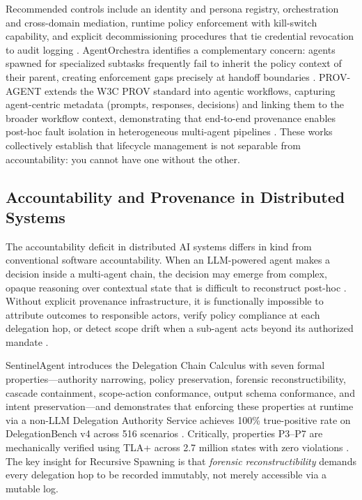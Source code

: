 Recommended controls include an identity and persona registry, orchestration and cross-domain mediation, runtime policy enforcement with kill-switch capability, and explicit decommissioning procedures that tie credential revocation to audit logging \cite{moore2025hmas, agentorchestra2025}. AgentOrchestra identifies a complementary concern: agents spawned for specialized subtasks frequently fail to inherit the policy context of their parent, creating enforcement gaps precisely at handoff boundaries \cite{agentorchestra2025}. PROV-AGENT extends the W3C PROV standard into agentic workflows, capturing agent-centric metadata (prompts, responses, decisions) and linking them to the broader workflow context, demonstrating that end-to-end provenance enables post-hoc fault isolation in heterogeneous multi-agent pipelines \cite{provcagent2025}. These works collectively establish that lifecycle management is not separable from accountability: you cannot have one without the other.

\subsection{Accountability and Provenance in Distributed Systems}

The accountability deficit in distributed AI systems differs in kind from conventional software accountability. When an LLM-powered agent makes a decision inside a multi-agent chain, the decision may emerge from complex, opaque reasoning over contextual state that is difficult to reconstruct post-hoc \cite{dzone2025accountability}. Without explicit provenance infrastructure, it is functionally impossible to attribute outcomes to responsible actors, verify policy compliance at each delegation hop, or detect scope drift when a sub-agent acts beyond its authorized mandate \cite{sentinelagent2026}.

SentinelAgent introduces the Delegation Chain Calculus with seven formal properties---authority narrowing, policy preservation, forensic reconstructibility, cascade containment, scope-action conformance, output schema conformance, and intent preservation---and demonstrates that enforcing these properties at runtime via a non-LLM Delegation Authority Service achieves 100\% true-positive rate on DelegationBench v4 across 516 scenarios \cite{sentinelagent2026}. Critically, properties P3--P7 are mechanically verified using TLA+ across 2.7 million states with zero violations \cite{sentinelagent2026}. The key insight for Recursive Spawning is that \textit{forensic reconstructibility} demands every delegation hop to be recorded immutably, not merely accessible via a mutable log.

